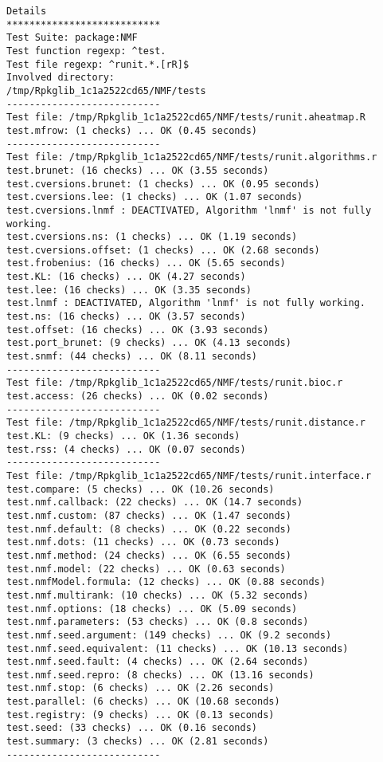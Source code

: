 \documentclass[10pt]{article}\usepackage[]{graphicx}\usepackage[]{color}
\begin{document}
\begin{verbatim}
Details 
*************************** 
Test Suite: package:NMF 
Test function regexp: ^test. 
Test file regexp: ^runit.*.[rR]$ 
Involved directory: 
/tmp/Rpkglib_1c1a2522cd65/NMF/tests 
--------------------------- 
Test file: /tmp/Rpkglib_1c1a2522cd65/NMF/tests/runit.aheatmap.R 
test.mfrow: (1 checks) ... OK (0.45 seconds)
--------------------------- 
Test file: /tmp/Rpkglib_1c1a2522cd65/NMF/tests/runit.algorithms.r 
test.brunet: (16 checks) ... OK (3.55 seconds)
test.cversions.brunet: (1 checks) ... OK (0.95 seconds)
test.cversions.lee: (1 checks) ... OK (1.07 seconds)
test.cversions.lnmf : DEACTIVATED, Algorithm 'lnmf' is not fully working.
test.cversions.ns: (1 checks) ... OK (1.19 seconds)
test.cversions.offset: (1 checks) ... OK (2.68 seconds)
test.frobenius: (16 checks) ... OK (5.65 seconds)
test.KL: (16 checks) ... OK (4.27 seconds)
test.lee: (16 checks) ... OK (3.35 seconds)
test.lnmf : DEACTIVATED, Algorithm 'lnmf' is not fully working.
test.ns: (16 checks) ... OK (3.57 seconds)
test.offset: (16 checks) ... OK (3.93 seconds)
test.port_brunet: (9 checks) ... OK (4.13 seconds)
test.snmf: (44 checks) ... OK (8.11 seconds)
--------------------------- 
Test file: /tmp/Rpkglib_1c1a2522cd65/NMF/tests/runit.bioc.r 
test.access: (26 checks) ... OK (0.02 seconds)
--------------------------- 
Test file: /tmp/Rpkglib_1c1a2522cd65/NMF/tests/runit.distance.r 
test.KL: (9 checks) ... OK (1.36 seconds)
test.rss: (4 checks) ... OK (0.07 seconds)
--------------------------- 
Test file: /tmp/Rpkglib_1c1a2522cd65/NMF/tests/runit.interface.r 
test.compare: (5 checks) ... OK (10.26 seconds)
test.nmf.callback: (22 checks) ... OK (14.7 seconds)
test.nmf.custom: (87 checks) ... OK (1.47 seconds)
test.nmf.default: (8 checks) ... OK (0.22 seconds)
test.nmf.dots: (11 checks) ... OK (0.73 seconds)
test.nmf.method: (24 checks) ... OK (6.55 seconds)
test.nmf.model: (22 checks) ... OK (0.63 seconds)
test.nmfModel.formula: (12 checks) ... OK (0.88 seconds)
test.nmf.multirank: (10 checks) ... OK (5.32 seconds)
test.nmf.options: (18 checks) ... OK (5.09 seconds)
test.nmf.parameters: (53 checks) ... OK (0.8 seconds)
test.nmf.seed.argument: (149 checks) ... OK (9.2 seconds)
test.nmf.seed.equivalent: (11 checks) ... OK (10.13 seconds)
test.nmf.seed.fault: (4 checks) ... OK (2.64 seconds)
test.nmf.seed.repro: (8 checks) ... OK (13.16 seconds)
test.nmf.stop: (6 checks) ... OK (2.26 seconds)
test.parallel: (6 checks) ... OK (10.68 seconds)
test.registry: (9 checks) ... OK (0.13 seconds)
test.seed: (33 checks) ... OK (0.16 seconds)
test.summary: (3 checks) ... OK (2.81 seconds)
--------------------------- 

\end{verbatim}
\end{document}
